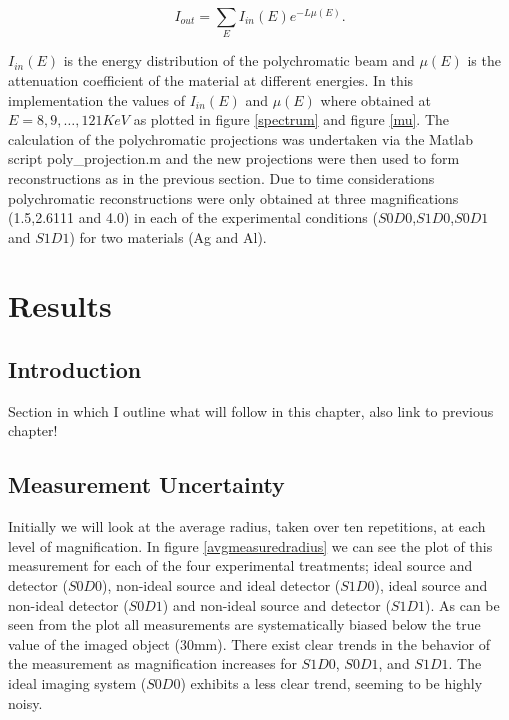 \documentclass[
  twoside,
  11pt, a4paper,
  footinclude=true,
  headinclude=true,
  cleardoublepage=empty
]{scrbook}
\begin{document}
\[
I_{out} = \sum_E I_{in}(E) e^{-L \mu(E)}.
\]

$I_{in}(E)$ is the energy distribution of the polychromatic beam and $\mu(E)$ is the attenuation coefficient of the material at different energies. In this implementation the values of $I_{in}(E)$ and $\mu(E)$ where obtained at $E = 8,9,\ldots,121 KeV$ as plotted in figure \ref{spectrum} and figure \ref{mu}. The calculation of the polychromatic projections was undertaken via the Matlab script poly\_projection.m and the new projections were then used to form reconstructions as in the previous section. Due to time considerations polychromatic reconstructions were only obtained at three magnifications (1.5,2.6111 and 4.0) in each of the experimental conditions ($S0D0$,$S1D0$,$S0D1$ and $S1D1$) for two materials (Ag and Al).

\chapter{Results}

\section{Introduction}

Section in which I outline what will follow in this chapter, also link to previous chapter!

\section{Measurement Uncertainty}

Initially we will look at the average radius, taken over ten repetitions, at each level of magnification. In figure \ref{avgmeasuredradius} we can see the plot of this measurement for each of the four experimental treatments; ideal source and detector ($S0D0$), non-ideal source and ideal detector ($S1D0$), ideal source and non-ideal detector ($S0D1$) and non-ideal source and detector ($S1D1$). As can be seen from the plot all measurements are systematically biased below the true value of the imaged object (30mm). There exist clear trends in the behavior of the measurement as magnification increases for $S1D0$, $S0D1$, and $S1D1$. The ideal imaging system ($S0D0$) exhibits a less clear trend, seeming to be highly noisy.
\end{document}
